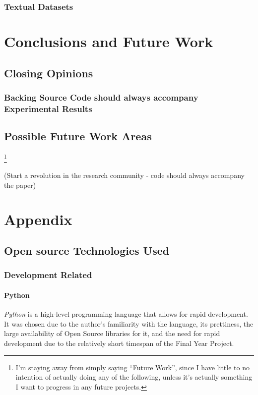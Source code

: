 \documentclass[a4paper,11pt]{report}
\begin{document}
\subsection{Textual Datasets}

\chapter{Conclusions and Future Work\label{cha:conclusions}}

\section{Closing Opinions}
\subsection{Backing Source Code should always accompany Experimental Results}

\section{Possible Future Work Areas} \footnote{I'm staying away from simply saying ``Future Work'', since I have little to no intention of actually doing any of the following, unless it's actually something I want to progress in any future projects.}



(Start a revolution in the research community - code should always accompany the paper)

\chapter{Appendix}
\section{Open source Technologies Used}

\subsection{Development Related}

\subsubsection*{Python}
\emph{Python}\citep{prog:python} is a high-level programming language that allows for rapid development. It was chosen due to the author's familiarity with the language, its prettiness, the large availability of Open Source libraries for it, and the need for rapid development due to the relatively short timespan of the Final Year Project.
\end{document}
